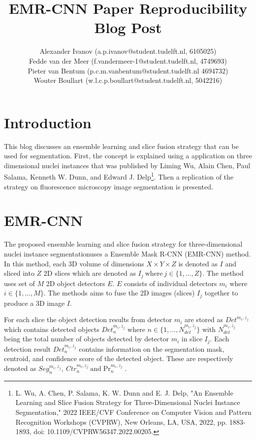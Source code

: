 \documentclass[a4]{article}
\title{EMR-CNN Paper Reproducibility Blog Post}
\author{
    Alexander Ivanov (a.p.ivanov@student.tudelft.nl, 6105025) \\
    Fedde van der Meer (f.vandermeer-1@student.tudelft.nl, 4749693) \\
    Pieter van Bentum (p.c.m.vanbentum@student.tudelft.nl 4694732) \\
    Wouter Boullart (w.l.c.p.boullart@student.tudelft.nl, 5042216)
}
\begin{document}
\maketitle

\section{Introduction}

This blog discusses an ensemble learning and slice fusion strategy that can be used for segmentation. First, the concept is explained using a application on three dimensional nuclei instances that was published by Liming Wu, Alain Chen, Paul Salama, Kenneth W. Dunn, and Edward J. Delp\footnote{L. Wu, A. Chen, P. Salama, K. W. Dunn and E. J. Delp, "An Ensemble Learning and Slice Fusion Strategy for Three-Dimensional Nuclei Instance Segmentation," 2022 IEEE/CVF Conference on Computer Vision and Pattern Recognition Workshops (CVPRW), New Orleans, LA, USA, 2022, pp. 1883-1893, doi: 10.1109/CVPRW56347.2022.00205.\label{original_paper}}. Then a replication of the strategy on fluorescence microscopy image segmentation is presented.

\section{EMR-CNN}

The proposed ensemble learning and slice fusion strategy for three-dimensional nuclei instance segmentation\footnotemark[1] uses a Ensemble Mask R-CNN (EMR-CNN) method. In this method, each 3D volume of dimensions \(X \times Y \times Z\) is denoted as $I$ and sliced into $Z$ 2D slices which are denoted as \(I_j \  \text{where} \  j \in \{1, ... , Z\}\). The method uses set of \(M\) 2D object detectors \(E\). \(E\) consists of individual detectors \(m_i\) where \(i \in \{1, ..., M\}\). The methods aims to fuse the 2D images (slices) \(I_j\) together to produce a 3D image \(I\).

For each slice the object detection results from detector \(m_i\) are stored as \(Det^{m_{i},z_{j}}\) which contains detected objects \(Det_{n}^{{m_i},z_{j}}\) where \(n \in \{1, ..., N_{det}^{m_{i},z_{j}}\}\) with \(N_{det}^{m_{i},z_{j}}\) being the total number of objects detected by detector \(m_{i}\) in slice \(I_j\). Each detection result \(Det_{n}^{{m_i},z_{j}}\) contains information on the segmentation mask, centroid, and confidence score of the detected object. These are respectively denoted as \(Seg_{n}^{{m_i},z_{j}},\ Ctr_{n}^{{m_i},z_{j}} \ \text{and} \Pr_{n}^{{m_i},z_{j}}\).
\end{document}
